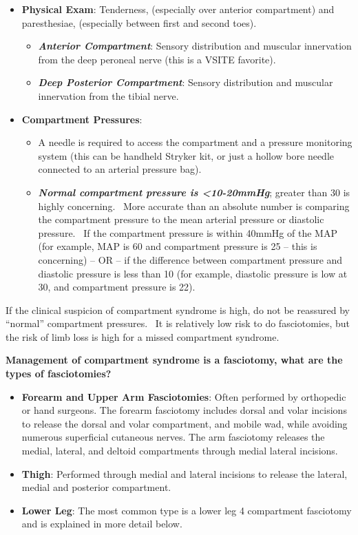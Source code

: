 \documentclass[
]{book}
\begin{document}
\begin{itemize}
\item
  \textbf{Physical Exam}: Tenderness, (especially over anterior compartment)
  and paresthesiae, (especially between first and second toes).

  \begin{itemize}
  \item
    \textbf{\emph{Anterior Compartment}}: Sensory distribution and muscular
    innervation from the deep peroneal nerve (this is a VSITE favorite).
  \item
    \textbf{\emph{Deep Posterior Compartment}}: Sensory distribution and muscular
    innervation from the tibial nerve\citep{velmahos2002}.
  \end{itemize}
\item
  \textbf{Compartment Pressures}:

  \begin{itemize}
  \item
    A needle is required to access the compartment and a pressure
    monitoring system (this can be handheld Stryker kit, or just a hollow
    bore needle connected to an arterial pressure bag).
  \item
    \textbf{\emph{Normal compartment pressure is \textless10-20mmHg}}; greater than 30 is
    highly concerning.~ More accurate than an absolute
    number is comparing the compartment pressure to the mean
    arterial pressure or diastolic pressure.~ If the compartment
    pressure is within 40mmHg of the MAP (for example, MAP is 60 and
    compartment pressure is 25 -- this is concerning) -- OR -- if
    the difference between compartment pressure and diastolic
    pressure is less than 10 (for example, diastolic pressure is low
    at 30, and compartment pressure is 22).
  \end{itemize}
\end{itemize}

If the clinical suspicion of compartment syndrome is high, do not be
reassured by ``normal'' compartment pressures.~ It is relatively low risk
to do fasciotomies, but the risk of limb loss is high for a missed
compartment syndrome.

\textbf{Management of compartment syndrome is a fasciotomy, what are the types
of fasciotomies?}

\begin{itemize}
\item
  \textbf{Forearm and Upper Arm Fasciotomies}: Often performed by orthopedic
  or hand surgeons. The forearm fasciotomy includes dorsal and volar
  incisions to release the dorsal and volar compartment, and mobile
  wad, while avoiding numerous superficial cutaneous nerves. The arm
  fasciotomy releases the medial, lateral, and deltoid compartments
  through medial lateral incisions.
\item
  \textbf{Thigh}: Performed through medial and lateral incisions to release
  the lateral, medial and posterior compartment.
\item
  \textbf{Lower Leg}: The most common type is a lower leg 4 compartment fasciotomy
  and is explained in more detail below. ~
\end{itemize}
\end{document}
